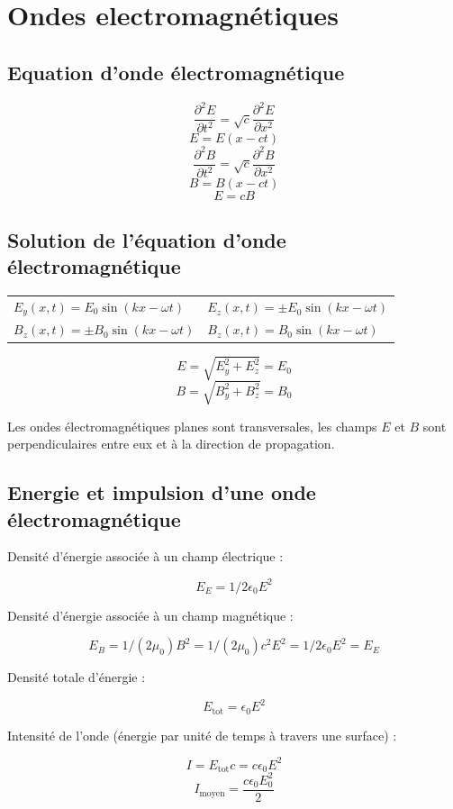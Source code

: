 \documentclass[a4paper,10pt,openright,titlepage]{report}
\begin{document}
\section{Ondes electromagnétiques}
\subsection{Equation d'onde électromagnétique}
$$\frac{\partial^2 E}{\partial t^2} = \sqrt{c}\frac{\partial^2 E}{\partial x^2}$$
$$E = E(x-ct)$$
$$\frac{\partial^2 B}{\partial t^2} = \sqrt{c}\frac{\partial^2 B}{\partial x^2}$$
$$B = B(x-ct)$$
$$E=cB$$
\subsection{Solution de l'équation d'onde électromagnétique}

\begin{center}
\begin{tabular}{ll}
$E_y (x,t) = E_0 \sin(kx - \omega t)$ & $E_z (x,t) = \pm E_0 \sin(kx - \omega t)$ \\ 
$B_z (x,t) = \pm B_0 \sin(kx - \omega t)$ & $B_z (x,t) = B_0 \sin(kx - \omega t)$
\end{tabular}
\end{center}

$$E = \sqrt{E^2_y + E^2_z} = E_0$$
$$B = \sqrt{B^2_y + B^2_z} = B_0$$

Les ondes électromagnétiques planes sont transversales, les champs $E$ et $B$ sont perpendiculaires entre eux et à la direction de propagation.
\subsection{Energie et impulsion d'une onde électromagnétique}

Densité d'énergie associée à un champ électrique : 

$$E_E = 1/2 \epsilon_0 E^2$$

Densité d'énergie associée à un champ magnétique :

$$E_B = 1/(2\mu_0) B^2 = 1/(2\mu_0) c^2 E^2 = 1/2 \epsilon_0 E^2 = E_E$$

Densité totale d'énergie :

$$E_{\mbox{tot}} = \epsilon_0 E^2$$

Intensité de l'onde (énergie par unité de temps à travers une surface) :

$$I = E_{\mbox{tot}} c = c \epsilon_0 E^2$$
$$I_{\mbox{moyen}} = \frac{c \epsilon_0 E^2_0}{2}$$
\end{document}
